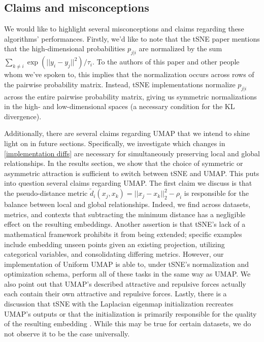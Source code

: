 \documentclass{article}
\theoremstyle{definition}
\begin{document}
\begin{multicols}{2}
\subsection{Claims and misconceptions}
We would like to highlight several misconceptions and claims regarding these algorithms' performances. Firstly, we'd like to note that the tSNE paper mentions
that the high-dimensional probabilities $p_{j|i}$ are normalized by the sum $\sum_{k \neq i} \exp\left( ||y_i - y_j||^2 \right) / \tau_i$. To the authors of
this paper and other people whom we've spoken to, this implies that the normalization occurs across rows of the pairwise probability matrix. Instead, tSNE
implementations normalize $p_{j|i}$ across the entire pairwise probability matrix, giving us symmetric normalizations in the high- and low-dimensional spaces (a
necessary condition for the KL divergence).

Additionally, there are several claims regarding UMAP that we intend to shine light on in future sections. Specifically, we investigate which changes in 
\ref{implementation diffs} are necessary for simultaneously preserving local and global relationships. In the results section, we show that the choice of symmetric
or asymmetric attraction is sufficient to switch between tSNE and UMAP. 
This puts into question several claims regarding UMAP. The first claim we discuss is that the pseudo-distance metric $\tilde{d}_i(x_j, x_k) = ||x_j - x_k||_2^2
- \rho_i$ is responsible for the balance between local and global relationships. Indeed, we find across datasets, metrics, and contexts that subtracting the minimum
distance has a negligible effect on the resulting embeddings. Another assertion is that tSNE's lack of a mathematical framework prohibits it from being
extended; specific examples include embedding unseen
points given an existing projection, utilizing categorical variables, and consolidating differing metrics. However, our implementation of Uniform UMAP is able
to, under tSNE's normalization and optimization schema, perform all of these tasks in the same way as UMAP. We also point out that UMAP's described attractive
and repulsive forces actually each contain their own attractive and repulsive forces. Lastly, there is a discussion that tSNE
with the Laplacian eigenmap initialization recreates UMAP's outputs \cite{kobak2019umap} or that the initialization is primarily responsible for the quality of
the resulting embedding \cite{kobak2021initialization}. While this may be true for certain datasets, we do not observe it to be the case universally.


\end{multicols}
\end{document}
